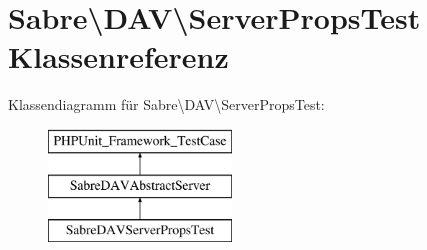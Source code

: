 \hypertarget{class_sabre_1_1_d_a_v_1_1_server_props_test}{}\section{Sabre\textbackslash{}D\+AV\textbackslash{}Server\+Props\+Test Klassenreferenz}
\label{class_sabre_1_1_d_a_v_1_1_server_props_test}
Klassendiagramm für Sabre\textbackslash{}D\+AV\textbackslash{}Server\+Props\+Test\+:\begin{figure}[H]
\begin{center}
\leavevmode
\includegraphics[height=3.000000cm]{class_sabre_1_1_d_a_v_1_1_server_props_test}
\end{center}
\end{figure}
